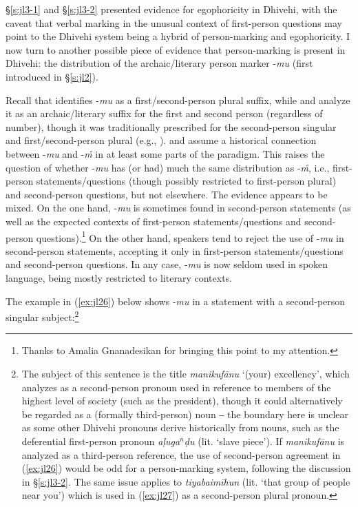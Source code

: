 \documentclass[output=paper]{langsci/langscibook}
\begin{document}
§‎\ref{s:jl3-1} and §‎\ref{s:jl3-2} presented evidence for egophoricity in Dhivehi, with the caveat that verbal marking in the unusual context of first-person questions may point to the Dhivehi system being a hybrid of person-marking and egophoricity. I now turn to another possible piece of evidence that person-marking is present in Dhivehi: the distribution of the archaic/literary person marker -\textit{mu} (first introduced in §‎\ref{s:jl2}). 

Recall that \cite{Fritz2002} identifies -\textit{mu} as a first/second-person plural suffix, while \cite{CainGair2000} and \cite{Gnanadesikan2017} analyze it as an archaic/literary suffix for the first and second person (regardless of number), though it was traditionally prescribed for the second-person singular and first/second-person plural (e.g., \citealt{Ahmad1970}). \cite[169]{Fritz2002} and \cite[27]{CainGair2000} assume a historical connection between -\textit{mu} and -\textit{m̊} in at least some parts of the paradigm. This raises the question of whether -\textit{mu} has (or had) much the same distribution as -\textit{m̊}, i.e., first-person statements/questions (though possibly restricted to first-person plural) and second-person questions, but not elsewhere. The evidence appears to be mixed. On the one hand, -\textit{mu} is sometimes found in second-person statements (as well as the expected contexts of first-person statements/questions and second-person questions).\footnote{Thanks to Amalia Gnanadesikan for bringing this point to my attention.}
On the other hand, speakers tend to reject the use of -\textit{mu} in second-person statements, accepting it only in first-person statements/questions and second-person questions. In any case, ‑\textit{mu} is now seldom used in spoken language, being mostly restricted to literary contexts.
   
The example in (\ref{ex:jl26}) below shows ‑\textit{mu} in a statement with a second-person singular subject:\footnote{The subject of this sentence is the title \textit{manikufānu} ‘(your) excellency’, which \cite[136]{Fritz2002} analyzes as a second-person pronoun used in reference to members of the highest level of society (such as the president), though it could alternatively be regarded as a (formally third-person) noun ‒ the boundary here is unclear as some other Dhivehi pronouns derive historically from nouns, such as the deferential first-person pronoun \textit{aḷuga$^n$ḍu} (lit. ‘slave piece’). If \textit{manikufānu} is analyzed as a third-person reference, the use of second-person agreement in (\ref{ex:jl26}) would be odd for a person-marking system, following the discussion in §‎‎\ref{s:jl3-2}. The same issue applies to \textit{tiyabaimīhun} (lit. ‘that group of people near you’) which is used in (\ref{ex:jl27}) as a second-person plural pronoun.}
\end{document}
